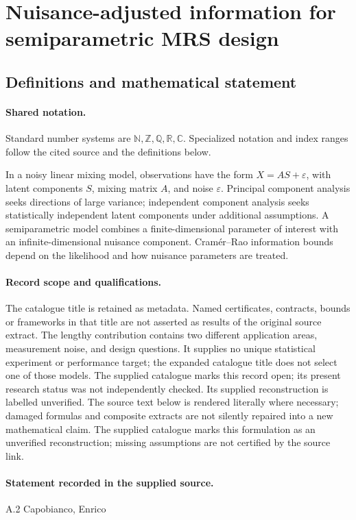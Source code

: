\documentclass[11pt]{article}
\begin{document}
\section{Nuisance-adjusted information for semiparametric MRS design}\label{statement}

\subsection{Definitions and mathematical statement}

\paragraph{Shared notation.}Standard number systems are $\mathbb N,\mathbb Z,\mathbb Q,\mathbb R,\mathbb C$. Specialized notation and index ranges follow the cited source and the definitions below.


In a noisy linear mixing model, observations have the form $X=AS+\varepsilon$, with latent components $S$, mixing matrix $A$, and noise $\varepsilon$. Principal component analysis seeks directions of large variance; independent component analysis seeks statistically independent latent components under additional assumptions. A semiparametric model combines a finite-dimensional parameter of interest with an infinite-dimensional nuisance component. Cramér--Rao information bounds depend on the likelihood and how nuisance parameters are treated.
\paragraph{Record scope and qualifications.}
The catalogue title is retained as metadata. Named certificates, contracts, bounds or frameworks in that title are not asserted as results of the original source extract.
The lengthy contribution contains two different application areas, measurement noise, and design questions. It supplies no unique statistical experiment or performance target; the expanded catalogue title does not select one of those models. The supplied catalogue marks this record open; its present research status was not independently checked. Its supplied reconstruction is labelled unverified.
The source text below is rendered literally where necessary; damaged formulas and composite extracts are not silently repaired into a new mathematical claim.
The supplied catalogue marks this formulation as an unverified reconstruction; missing assumptions are not certified by the source link.
\paragraph{Statement recorded in the supplied source.}
A.2 Capobianco, Enrico
\end{document}
